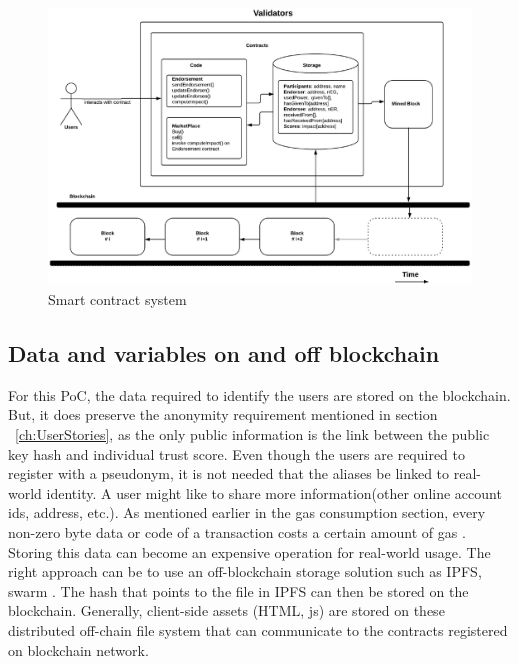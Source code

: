 \begin{figure}
	\centering
	\includegraphics[width=1.0\textwidth]{Images/SmartContractsEDSMarketPlace.eps}
	\caption{Smart contract system}
	\label{fig:smartcontracts}
\end{figure}


\subsection{Data and variables on and off blockchain}
For this PoC, the data required to identify the users are stored on the
blockchain. But, it does preserve the anonymity requirement mentioned in
section ~\ref{ch:UserStories}, as the only public information is the link
between the public key hash and individual trust score. Even though the users
are required to register with a pseudonym, it is not needed that the aliases be
linked to real-world identity. A user might like to share more
information(other online account ids, address, etc.).  As mentioned earlier in
the gas consumption section, every non-zero byte data or code of a transaction
costs a certain amount of gas \cite{buterin2013ethereum}. Storing this data can
become an expensive operation for real-world usage. The right approach can be
to use an off-blockchain storage solution such as IPFS, swarm
\cite{benet2014ipfs}. The hash that points to the file in IPFS can then be
stored on the blockchain.  Generally, client-side assets (HTML, js) are stored
on these distributed off-chain file system that can communicate to the
contracts registered on blockchain network. 

